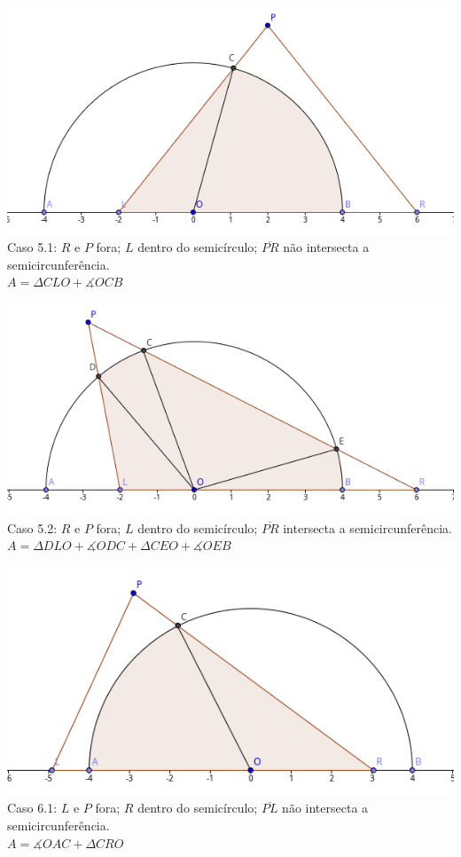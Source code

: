 \begin{center}
    \includegraphics[scale=1.7]{arremesso/editorial-imgs/caso51.png}\\
    Caso 5.1: $R$ e $P$ fora; $L$ dentro do semicírculo; $\overline{PR}$ não
    intersecta a semicircunferência.\\$A = \Delta CLO + \measuredangle OCB$
\end{center}

\begin{center}
    \includegraphics[scale=1.7]{arremesso/editorial-imgs/caso52.png}\\
    Caso 5.2: $R$ e $P$ fora; $L$ dentro do semicírculo; $\overline{PR}$ intersecta a semicircunferência.\\
    $A = \Delta DLO + \measuredangle ODC + \Delta CEO + \measuredangle OEB$
\end{center}

\begin{center}
    \includegraphics[scale=1.7]{arremesso/editorial-imgs/caso61.png}\\
    Caso 6.1: $L$ e $P$ fora; $R$ dentro do semicírculo; $\overline{PL}$ não intersecta a semicircunferência.\\
    $A = \measuredangle OAC + \Delta CRO$
\end{center}

